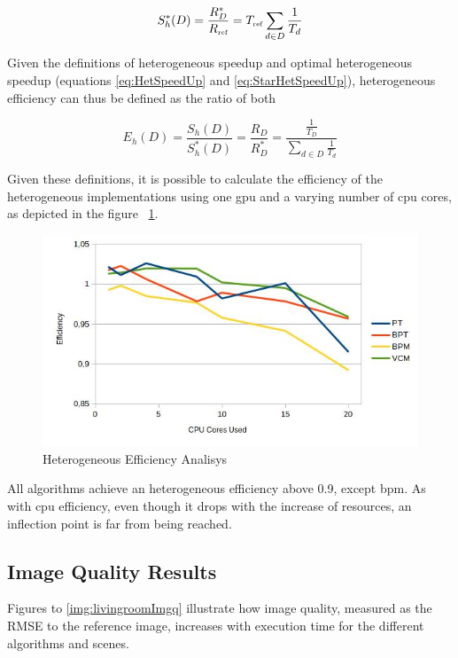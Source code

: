 \begin{equation}
S^*_h(D) = \frac{R^*_D}{R_{\mbox{\tiny ref}}} = T_{\mbox{\tiny ref}} \sum_{d \in D} \frac{1}{T_d}
\label{eq:StarHetSpeedUp}
\end{equation}

Given the definitions of heterogeneous speedup and optimal heterogeneous speedup (equations \ref{eq:HetSpeedUp} and \ref{eq:StarHetSpeedUp}), heterogeneous efficiency can thus be defined as the ratio of both

\begin{equation}
E_h(D) = \frac{S_h(D)}{S_h^*(D)} = \frac{R_D}{R^*_D} = \frac{\frac{1}{T_D}}{\sum_{d \in D} \frac{1}{T_d}}
\label{eq:HetEff}
\end{equation}

Given these definitions, it is possible to calculate the efficiency of the heterogeneous implementations using one \gls{gpu} and a varying number of \gls{cpu} cores, as depicted in the figure ~\ref{img:hefficiency}.

\begin{figure}[H]
\centering
\includegraphics[width=0.8\linewidth]{img/hefficiency.jpg}
\caption{\label{img:hefficiency} Heterogeneous Efficiency Analisys}
\end{figure}

All algorithms achieve an heterogeneous efficiency above 0.9, except \gls{bpm}. As with \gls{cpu} efficiency, even though it drops with the increase of resources, an inflection point is far from being reached.

\subsection{Image Quality Results}

Figures \label{img:sponzaImgq} to \ref{img:livingroomImgq} illustrate how image quality, measured as the RMSE to the reference image, increases with execution time for the different algorithms and scenes.

